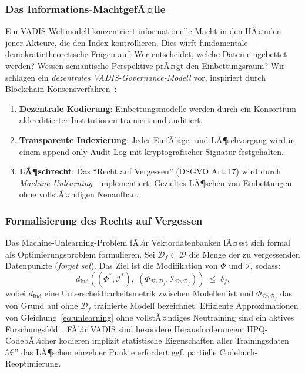 ﻿\documentclass[12pt,a4paper]{article}
\begin{document}
\subsubsection{Das Informations-MachtgefÃ¤lle}

Ein VADIS-Weltmodell konzentriert informationelle Macht
in den HÃ¤nden jener Akteure, die den Index kontrollieren.
Dies wirft fundamentale demokratietheoretische Fragen auf:
Wer entscheidet, welche Daten eingebettet werden?
Wessen semantische Perspektive prÃ¤gt den Einbettungsraum?
Wir schlagen ein \emph{dezentrales VADIS-Governance-Modell}
vor, inspiriert durch Blockchain-Konsensverfahren~\cite{nakamoto2008bitcoin}:

\begin{enumerate}[leftmargin=1.2em, itemsep=2pt]
  \item \textbf{Dezentrale Kodierung}: Einbettungsmodelle
        werden durch ein Konsortium akkreditierter
        Institutionen trainiert und auditiert.
  \item \textbf{Transparente Indexierung}: Jeder EinfÃ¼ge-
        und LÃ¶schvorgang wird in einem
        append-only-Audit-Log mit kryptografischer
        Signatur festgehalten.
  \item \textbf{LÃ¶schrecht}: Das ``Recht auf Vergessen''
        (DSGVO Art.\,17) wird durch
        \emph{Machine Unlearning}~\cite{cao2015machineunlearning}
        implementiert: Gezieltes LÃ¶schen von
        Einbettungen ohne vollstÃ¤ndigen Neuaufbau.
\end{enumerate}

\subsubsection{Formalisierung des Rechts auf Vergessen}

Das Machine-Unlearning-Problem fÃ¼r Vektordatenbanken
lÃ¤sst sich formal als Optimie\-rungs\-problem formulieren.
Sei $\mathcal{D}_f \subset \mathcal{D}$ die Menge der
zu vergessenden Datenpunkte (\emph{forget set}).
Das Ziel ist die Modifikation von $\Phi$ und $\mathcal{I}$,
sodass:
\begin{equation}
  d_{\text{Ind}}\!\left(
    (\Phi^*, \mathcal{I}^*),\;
    (\Phi_{\mathcal{D} \setminus \mathcal{D}_f},
     \mathcal{I}_{\mathcal{D} \setminus \mathcal{D}_f})
  \right) \;\leq\; \delta_f,
  \label{eq:unlearning}
\end{equation}
wobei $d_{\text{Ind}}$ eine Unterscheidbarkeitsmetrik
zwischen Modellen ist und $\Phi_{\mathcal{D} \setminus \mathcal{D}_f}$
das von Grund auf ohne $\mathcal{D}_f$ trainierte Modell
bezeichnet. Effiziente Approximationen von
Gleichung~\eqref{eq:unlearning} ohne vollstÃ¤ndiges Neutraining
sind ein aktives Forschungsfeld~\cite{bourtoule2021machineunlearning}.
FÃ¼r VADIS sind besondere Herausforderungen:
HPQ-CodebÃ¼cher kodieren implizit statistische Eigenschaften
aller Trainingsdaten â€” das LÃ¶schen einzelner Punkte
erfordert ggf. partielle Codebuch-Reoptimierung.
\end{document}
